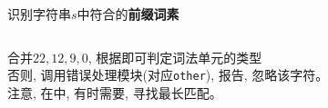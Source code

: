 \begin{frame}{}
  \begin{center}
    识别字符串$s$中符合的{\bf 前缀词素} 
  \end{center}

  \begin{columns}
      \begin{center}
      \end{center}
      \begin{center}
      \end{center}
  \end{columns}

  \pause
  \vspace{0.30cm}
  \begin{center}
     合并$22, 12, 9, 0$, 根据即可判定词法单元的类型 \\[4pt]
    否则, 调用错误处理模块(对应\texttt{other}), 报告, 忽略该字符。 \\[4pt]
    注意, 在\scinum{}中, 有时需要, 寻找最长匹配。
  \end{center}
\end{frame}

